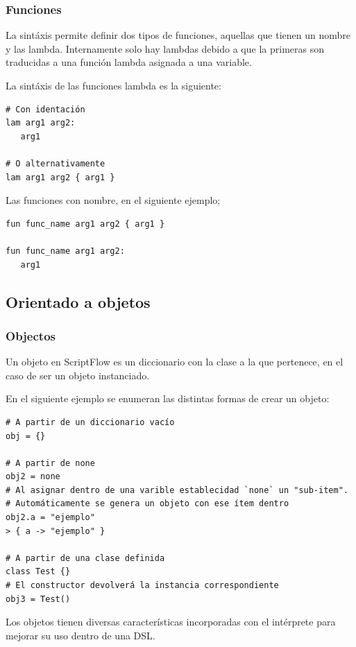 \documentclass[11pt]{article}
\begin{document}
\subsubsection{Funciones}
\label{sec:orgdd88e77}

La sintáxis permite definir dos tipos de funciones, aquellas que tienen un nombre y las lambda. Internamente solo hay lambdas debido
a que la primeras son traducidas a una función lambda asignada a una variable.

La sintáxis de las funciones lambda es la siguiente:
\begin{verbatim}
# Con identación
lam arg1 arg2:
   arg1

# O alternativamente
lam arg1 arg2 { arg1 }
\end{verbatim}

Las funciones con nombre, en el siguiente ejemplo;
\begin{verbatim}
fun func_name arg1 arg2 { arg1 }

fun func_name arg1 arg2:
   arg1
\end{verbatim}

\subsection{Orientado a objetos}
\label{sec:org609dc46}

\subsubsection{Objectos}
\label{sec:org8eab80c}
Un objeto en ScriptFlow es un diccionario con la clase a la que pertenece, en el caso de ser
un objeto instanciado.

En el siguiente ejemplo se enumeran las distintas formas de crear un objeto:

\begin{verbatim}
# A partir de un diccionario vacío
obj = {}

# A partir de none
obj2 = none
# Al asignar dentro de una varible establecidad `none` un "sub-item".
# Automáticamente se genera un objeto con ese ítem dentro
obj2.a = "ejemplo"
> { a -> "ejemplo" }

# A partir de una clase definida
class Test {}
# El constructor devolverá la instancia correspondiente
obj3 = Test()
\end{verbatim}

Los objetos tienen diversas características incorporadas con el intérprete para mejorar su uso dentro de una DSL.
\end{document}
